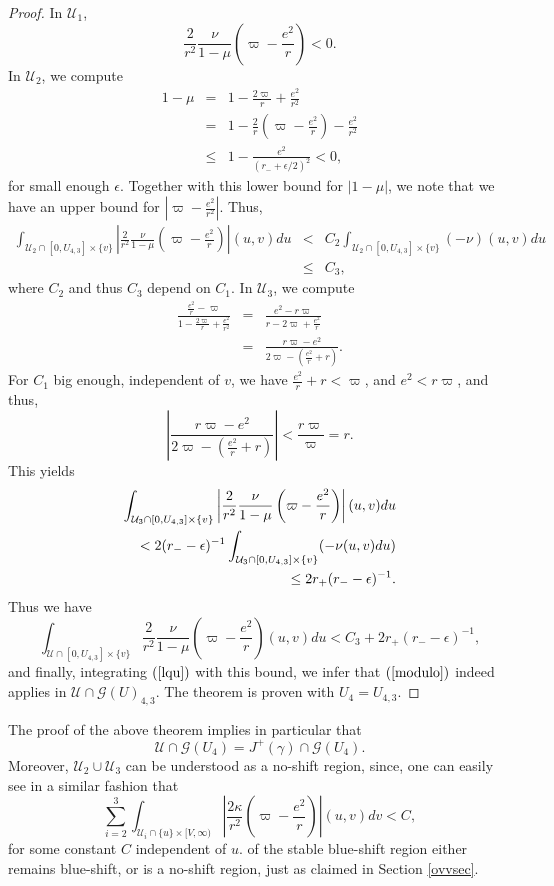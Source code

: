 \documentclass{article}
\begin{document}
{\begin{proof}
In $\mathcal{U}_1$, 
\[
\frac{2}{r^2}\frac{\nu}{1-\mu}\left(\varpi-\frac{e^2}r\right)<0.
\]
In $\mathcal{U}_2$, we compute
\begin{eqnarray*}
1-\mu&=&1-\frac{2\varpi}r+\frac{e^2}{r^2}\\
&=&1-\frac{2}{r}\left(\varpi-\frac{e^2}{r}\right)-\frac{e^2}{r^2}\\
&\le&1-\frac{e^2}{(r_-+\epsilon/2)^2}<0,
\end{eqnarray*}
for small enough $\epsilon$. Together with this
lower bound for $|1-\mu|$, we note that we have an upper bound
for $\left|\varpi-\frac{e^2}{r^2}\right|$. 
Thus, 
\begin{eqnarray*}
\int_{\mathcal{U}_2\cap[0,U_{4,3}]\times\{v\}}
{\left|\frac{2}{r^2}\frac{\nu}{1-\mu}\left(\varpi-\frac{e^2}r\right)\right|
(u,v)du}&<&
C_2\int_{\mathcal{U}_2\cap[0,U_{4,3}]\times\{v\}}(-\nu)(u,v)du\\
&\le& C_3,
\end{eqnarray*}
where $C_2$ and thus $C_3$ depend on $C_1$.
In $\mathcal{U}_3$, we compute
\begin{eqnarray*}
\frac{\frac{e^2}r-\varpi}{1-\frac{2\varpi}{r}+\frac{e^2}{r^2}}
&=&\frac{e^2-r\varpi}{r-2\varpi+\frac{e^2}r}\\
&=&\frac{r\varpi-e^2}{2\varpi-\left(\frac{e^2}r+r\right)}.
\end{eqnarray*}
For $C_1$ big enough, independent of $v$,
we have $\frac{e^2}r+r<\varpi$, and $e^2<r\varpi$,
and thus,
\[
\left|\frac{r\varpi-e^2}{2\varpi-\left(\frac{e^2}r+r\right)}\right|
<\frac{r\varpi}{\varpi}=r.
\]
This yields
\begin{eqnarray*}
\int_{\mathcal{U}_3\cap[0,U_{4,3}]\times\{v\}}
{\left|\frac{2}{r^2}\frac{\nu}{1-\mu}\left(\varpi-\frac{e^2}r\right)\right|
(u,v)du}\\
\hbox{\ \ }<2(r_--\epsilon)^{-1}
\int_{\mathcal{U}_3\cap[0,U_{4,3}]\times\{v\}}(-\nu(u,v) du)\\
\hbox{\ \ }
\le 2r_+(r_--\epsilon)^{-1}.
\end{eqnarray*}
Thus we have
\[
\int_{\mathcal{U}\cap[0,U_{4,3}]\times\{v\}}
{\frac{2}{r^2}\frac{\nu}{1-\mu}\left(\varpi-\frac{e^2}r\right)(u,v)du}<
C_3+2r_+(r_--\epsilon)^{-1},
\]
and finally, integrating $(\ref{lqu})$
with this bound, we infer that $(\ref{modulo})$ indeed applies
in $\mathcal{U}\cap\mathcal{G}(U)_{4,3}$. 
The theorem is proven with $U_4=U_{4,3}$.
\end{proof}

The proof of the above theorem implies in particular that
\[
\mathcal{U}\cap\mathcal{G}(U_4)=J^+(\gamma)\cap\mathcal{G}(U_4).
\] 
Moreover, $\mathcal{U}_2\cup\mathcal{U}_3$ can be understood
as a no-shift region, since, one can easily see in a similar fashion
that
\[
\sum_{i=2}^3\int_{\mathcal{U}_i\cap\{u\}\times[V,\infty)}\left|
\frac{2\kappa}{r^2}\left(
\varpi-\frac{e^2}r\right)\right|(u,v)dv<C,
\]
for some constant $C$ independent of $u$.
of the stable blue-shift region either remains blue-shift, or
is a no-shift region, just as claimed in Section \ref{ovvsec}.


}
\end{document}

